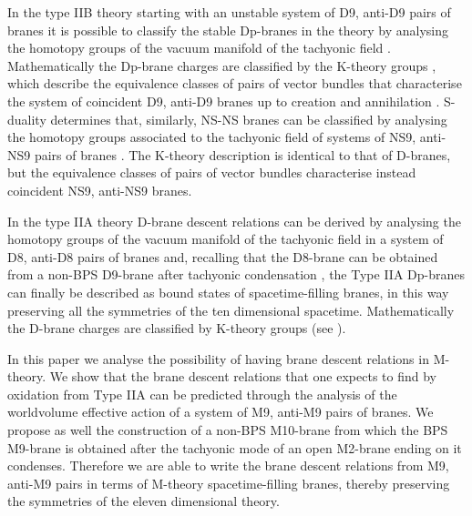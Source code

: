 \documentclass[12pt,a4paper]{article}
\begin{document}
In the type IIB theory starting with an unstable system of D9, anti-D9
pairs of branes it is possible to classify the stable Dp-branes 
in the theory by analysing the homotopy groups of the vacuum
manifold of the tachyonic field \cite{Witten}.
Mathematically the Dp-brane charges are
classified by the K-theory groups \coordHE{},
which describe the equivalence classes
of pairs of vector bundles that characterise the system of coincident
D9, anti-D9 branes up to creation and annihilation \cite{Witten}. 
S-duality determines that, similarly, NS-NS branes can be 
classified by analysing the
homotopy groups associated to the tachyonic field of systems of
NS9, anti-NS9 pairs of branes \cite{HL2}. 
The K-theory description is identical
to that of D-branes, but the equivalence classes of pairs of vector
bundles characterise instead coincident NS9, anti-NS9 branes.

In the type IIA theory D-brane descent relations can be derived by 
analysing the homotopy groups of the vacuum manifold of the tachyonic 
field in a system of \coordHE{} D8, anti-D8 pairs of branes and, 
recalling that the D8-brane
can be obtained from a non-BPS D9-brane after tachyonic condensation
\cite{Horava}, the Type IIA Dp-branes can finally be described as 
bound states of spacetime-filling branes, in this way preserving all the
symmetries of the ten dimensional spacetime. Mathematically the
D-brane charges are classified by \coordHE{} K-theory groups
(see \cite{Horava}).

In this paper we analyse the possibility of having 
brane descent relations in M-theory. We show that the brane descent
relations that one expects
to find by oxidation from Type IIA can be
predicted through the analysis of the worldvolume effective action of a
system of \coordHE{} M9, anti-M9 pairs of branes.
We propose  as well the construction of a non-BPS M10-brane from which the BPS M9-brane
is obtained after the tachyonic mode of an open M2-brane ending 
on it condenses. Therefore we are able to write the brane descent 
relations from M9, anti-M9 pairs in terms of M-theory 
spacetime-filling branes, thereby preserving the symmetries of the
eleven dimensional theory.
\end{document}
